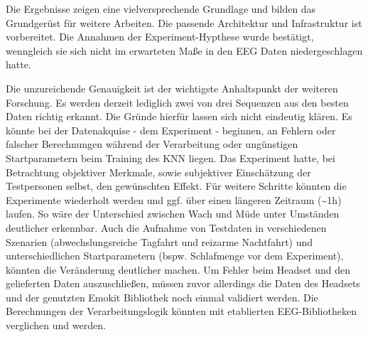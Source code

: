 \label{chap:conclusion}
Die Ergebnisse zeigen eine vielversprechende Grundlage und bilden das Grundgerüst für weitere Arbeiten. Die passende Architektur und Infrastruktur ist vorbereitet. Die Annahmen der Experiment-Hypthese wurde bestätigt, wenngleich sie sich nicht im erwarteten Maße in den EEG Daten niedergeschlagen hatte.

Die unzureichende Genauigkeit ist der wichtigste Anhaltspunkt der weiteren Forschung. Es werden derzeit lediglich zwei von drei Sequenzen aus den besten Daten richtig erkannt. 
Die Gründe hierfür lassen sich nicht eindeutig klären. Es könnte bei der Datenakquise - dem Experiment - beginnen, an Fehlern oder falscher Berechnungen während der Verarbeitung oder ungünstigen Startparametern beim Training des KNN liegen. Das Experiment hatte, bei Betrachtung objektiver Merkmale, sowie subjektiver Einschätzung der Testpersonen selbst, den gewünschten Effekt. Für weitere Schritte könnten die Experimente wiederholt werden und ggf. über einen längeren Zeitraum (\textasciitilde 1h) laufen. So wäre der Unterschied zwischen Wach und Müde unter Umständen deutlicher erkennbar. Auch die Aufnahme von Testdaten in verschiedenen Szenarien (abwechslungsreiche Tagfahrt und reizarme Nachtfahrt) und unterschiedlichen Startparametern (bspw. Schlafmenge vor dem Experiment), könnten die Veränderung deutlicher machen.
Um Fehler beim Headset und den gelieferten Daten auszuschließen, 
müssen zuvor allerdings die Daten des Headsets und der genutzten Emokit Bibliothek noch einmal validiert werden.
Die Berechnungen der Verarbeitungslogik könnten mit etablierten EEG-Bibliotheken verglichen und werden. 